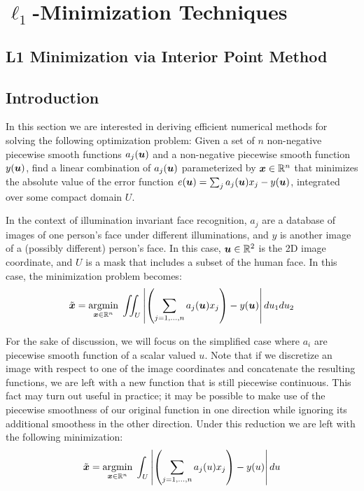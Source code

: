 \chapter{$\ell_1$-Minimization Techniques}
\label{chap:minimization}

\section{L1 Minimization via Interior Point Method} %






\section{Introduction} 
% 
In this section we are interested in deriving efficient numerical methods
for solving the following optimization problem:  Given a set of $n$
non-negative piecewise smooth functions $a_j(\boldsymbol{u})$ and a non-negative piecewise
smooth function $y(\boldsymbol{u})$,  find a linear combination of $a_j(\boldsymbol{u})$ parameterized
by ${\boldsymbol{x}} \in \mathbb R^n$ that minimizes the absolute value of the error function
$e(\boldsymbol{u}) = \sum_ja_j(\boldsymbol{u}) x_j - y(\boldsymbol{u})$, integrated over some compact domain $U$.

In the context of illumination invariant face recognition, $a_j$ are a database
of images of one person's face under different illuminations, and $y$ is
another image of a (possibly different) person's face.  In this case, $\boldsymbol{u} \in
\mathbb R^2$ is the 2D image coordinate, and $U$ is a mask that includes a subset of
the human face.  In this case, the minimization problem becomes:
\begin{equation}
\label{eqn:continuous2D} 
\tilde{{\boldsymbol{x}}} = {\hbox{$\underset{{\boldsymbol{x}}\in \mathbb R^n}{\mbox{argmin}}\;$}} \iint_U{\left|\left(\sum_{j=1,\ldots,n} a_j(\boldsymbol{u}) x_j\right) - y(\boldsymbol{u})\right| du_1 du_2} 
\end{equation}

For the sake of discussion, we will focus on the simplified case where $a_i$
are piecewise smooth function of a scalar valued $u$.  Note that if we
discretize an image with respect to one of the image coordinates and
concatenate the resulting functions, we are left with a new function that is
still piecewise continuous.  This fact may turn out useful in practice; it may
be possible to make use of the piecewise smoothness of our original function in
one direction while ignoring its additional smoothess in the other direction.
Under this reduction we are left with the following minimization:
\begin{equation}\label{eqn:continuous1D}
\tilde{{\boldsymbol{x}}} = {\hbox{$\underset{{\boldsymbol{x}}\in \mathbb R^n}{\mbox{argmin}}\;$}} \int_U{ \left|\left(\sum_{j=1,\ldots,n} a_j(u) x_j\right) - y(u)\right| du}
\end{equation}

